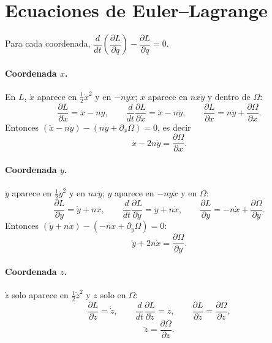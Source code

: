 \documentclass[12pt,letterpaper]{article}
\begin{document}
\section{Ecuaciones de Euler--Lagrange}

Para cada coordenada, $\dfrac{d}{dt}\left(\dfrac{\partial L}{\partial \dot q}\right) - \dfrac{\partial L}{\partial q} = 0$.

\paragraph{Coordenada $x$.} En $L$, $\dot x$ aparece en $\tfrac12\dot x^2$ y en $-n y\dot x$;
$x$ aparece en $n x\dot y$ y dentro de $\Omega$:
\[
\frac{\partial L}{\partial \dot x} = \dot x - n y, \qquad
\frac{d}{dt}\frac{\partial L}{\partial \dot x} = \ddot x - n\dot y, \qquad
\frac{\partial L}{\partial x} = n\dot y + \frac{\partial\Omega}{\partial x}.
\]
Entonces $(\ddot x - n\dot y) - (n\dot y + \partial_x\Omega) = 0$, es decir
\begin{equation}
\ddot x - 2n\dot y = \frac{\partial \Omega}{\partial x}.
\label{eq:x}
\end{equation}

\paragraph{Coordenada $y$.} $\dot y$ aparece en $\tfrac12\dot y^2$ y en $n x\dot y$; $y$
aparece en $-n y\dot x$ y en $\Omega$:
\[
\frac{\partial L}{\partial \dot y} = \dot y + n x, \qquad
\frac{d}{dt}\frac{\partial L}{\partial \dot y} = \ddot y + n\dot x, \qquad
\frac{\partial L}{\partial y} = -n\dot x + \frac{\partial\Omega}{\partial y}.
\]
Entonces $(\ddot y + n\dot x) - (-n\dot x + \partial_y\Omega) = 0$:
\begin{equation}
\ddot y + 2n\dot x = \frac{\partial \Omega}{\partial y}.
\label{eq:y}
\end{equation}

\paragraph{Coordenada $z$.} $\dot z$ solo aparece en $\tfrac12\dot z^2$ y $z$ solo en $\Omega$:
\[
\frac{\partial L}{\partial \dot z} = \dot z, \qquad
\frac{d}{dt}\frac{\partial L}{\partial \dot z} = \ddot z, \qquad
\frac{\partial L}{\partial z} = \frac{\partial\Omega}{\partial z},
\]
\begin{equation}
\ddot z = \frac{\partial \Omega}{\partial z}.
\label{eq:z}
\end{equation}
\end{document}
